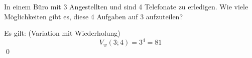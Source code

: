 \documentclass{abgabe}
\begin{document}
\begin{questions}
    \question
    In einem Büro mit 3 Angestellten und sind 4 Telefonate zu erledigen. 
    Wie viele Möglichkeiten gibt es, diese 4 Aufgaben auf 3 aufzuteilen?
    \begin{solution}
        Es gilt: (Variation mit Wiederholung)
        \[ 
            V_w(3;4) = 3^4 = 81
        \] 
        \qed
    \end{solution}
\end{questions}
\end{document}
